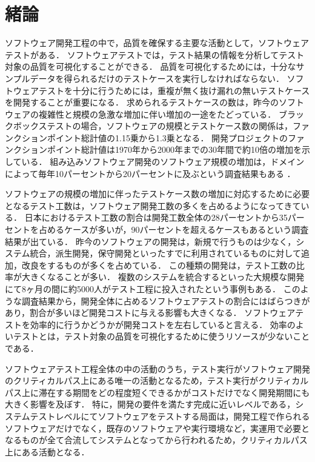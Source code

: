 \chapter{緒論}
ソフトウェア開発工程の中で，品質を確保する主要な活動として，ソフトウェアテストがある．
ソフトウェアテストでは，テスト結果の情報を分析してテスト対象の品質を可視化することができる．
品質を可視化するためには，十分なサンプルデータを得られるだけのテストケースを実行しなければならない．
ソフトウェアテストを十分に行うためには，重複が無く抜け漏れの無いテストケースを開発することが重要になる．
求められるテストケースの数は，昨今のソフトウェアの複雑性と規模の急激な増加に伴い増加の一途をたどっている．
ブラックボックステストの場合，ソフトウェアの規模とテストケース数の関係は，ファンクションポイント総計値の1.15乗から1.3乗となる\cite{jones1998estimating}．
開発プロジェクトのファンクションポイント総計値は1970年から2000年までの30年間で約10倍の増加を示している\cite{longstreet2000}．
組み込みソフトウェア開発のソフトウェア規模の増加は，ドメインによって毎年10パーセントから20パーセントに及ぶという調査結果もある \cite{jones2009}．

ソフトウェアの規模の増加に伴ったテストケース数の増加に対応するために必要となるテスト工数は，ソフトウェア開発工数の多くを占めるようになってきている．
日本におけるテスト工数の割合は開発工数全体の28パーセントから35パーセントを占めるケースが多いが，90パーセントを超えるケースもあるという調査結果が出ている\cite{IPA2015}．
昨今のソフトウェアの開発は，新規で行うものは少なく，システム統合，派生開発，保守開発といったすでに利用されているものに対して追加，改良をするものが多くを占めている．
この種類の開発は，テスト工数の比率が大きくなることが多い．
複数のシステムを統合するといった大規模な開発にて8ヶ月の間に約5000人がテスト工程に投入されたという事例もある\cite{MTBUDay2}．
このような調査結果から，開発全体に占めるソフトウェアテストの割合にはばらつきがあり，割合が多いほど開発コストに与える影響も大きくなる．
ソフトウェアテストを効率的に行うかどうかが開発コストを左右していると言える\cite{mantyla2013more}\cite{mantyla2014time}．
効率のよいテストとは，テスト対象の品質を可視化するために使うリソースが少ないことである．

ソフトウェアテスト工程全体の中の活動のうち，テスト実行がソフトウェア開発のクリティカルパス上にある唯一の活動となるため，テスト実行がクリティカルパス上に滞在する期間をどの程度短くできるかがコストだけでなく開発期間にも大きく影響を及ぼす．
特に，開発の要件を満たす完成に近いレベルである，システムテストレベルにてソフトウェアをテストする局面は，開発工程で作られるソフトウェアだけでなく，既存のソフトウェアや実行環境など，実運用で必要となるものが全て合流してシステムとなってから行われるため，クリティカルパス上にある活動となる．

